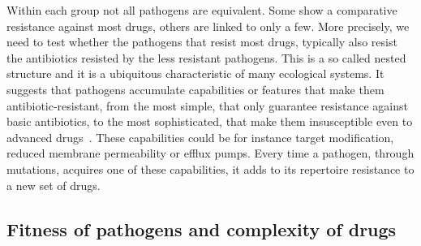 \documentclass[10pt]{article}
\begin{document}
Within each group not all pathogens are equivalent. Some show a comparative resistance against most drugs, others are linked to only a few. More precisely, we need to test whether the pathogens that resist most drugs, typically also resist the antibiotics resisted by the less resistant pathogens. This is a so called nested structure and it is a ubiquitous characteristic of many ecological systems. It suggests that pathogens accumulate capabilities or features that make them antibiotic-resistant, from the most simple, that only guarantee resistance against basic antibiotics, to the most sophisticated, that make them insusceptible even to advanced drugs~\cite{toprak2012,barbosa2017}. These capabilities could be for instance target modification, reduced membrane permeability or efflux pumps. Every time a pathogen, through mutations, acquires one of these capabilities, it adds to its repertoire resistance to a new set of drugs. 

\subsection*{Fitness of pathogens and complexity of drugs}
\end{document}

